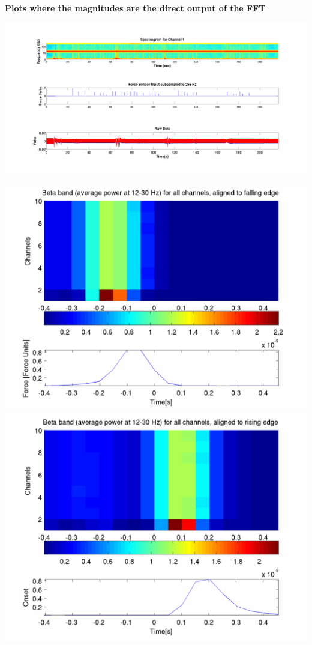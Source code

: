 \documentclass[12pt]{article}
\begin{document}
\begin{center}
\textbf{Plots where the magnitudes are the direct output of the FFT}
\end{center}

\includegraphics[scale=0.14]{raw_data_spectrogram.png}

\includegraphics[scale=0.2]{beta_falling.png}
\includegraphics[scale=0.2]{beta_rising.png}
\end{document}
